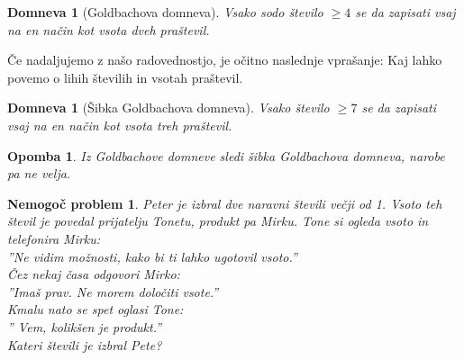 \documentclass{amsart}
\newtheorem{prob}[izrek]{Nemogoč problem}
\newtheorem{opomba}[izrek]{Opomba}
\newtheorem{domneva}[izrek]{Domneva}
\begin{document}
\begin{domneva}[Goldbachova domneva]
    Vsako sodo število $\geq 4$ se da zapisati vsaj na en način kot vsota dveh praštevil.
\end{domneva}

Če nadaljujemo z našo radovednostjo, je očitno naslednje vprašanje: Kaj lahko povemo o lihih številih in vsotah praštevil.
\begin{domneva}[Šibka Goldbachova domneva]
    Vsako število $\geq 7$ se da zapisati vsaj na en način kot vsota treh praštevil.
\end{domneva}

\begin{opomba}
    Iz Goldbachove domneve sledi šibka Goldbachova domneva, narobe pa ne velja.
\end{opomba}

\begin{prob}
    Peter je izbral dve naravni števili večji od 1. Vsoto teh števil je povedal prijatelju Tonetu, produkt pa Mirku. 
    Tone si ogleda vsoto in \\telefonira Mirku:\\
    ''Ne vidim možnosti, kako bi ti lahko ugotovil vsoto.''\\
    Čez nekaj časa odgovori Mirko:\\
    ''Imaš prav. Ne morem določiti vsote.''\\
    Kmalu nato se spet oglasi Tone:\\
    '' Vem, kolikšen je produkt.''\\
    Kateri števili je izbral Pete?\\
\end{prob}
\end{document}
